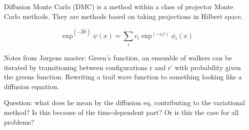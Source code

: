 Diffusion Monte Carlo (DMC) is a method within a class of projector Monte Carlo methods. They are methods based on taking projections in Hilbert space. 

\begin{equation}
\exp^{(-\hat{H}t)} \psi(x) = \sum_i c_i \exp^{(-\epsilon_i t)}\phi_i(x) 
\end{equation}

Notes from Jørgens master: Green's function, an ensemble of walkers can be iterated by transitioning between configurations r and r' with probability given the greens function. Rewriting a trail wave function to something looking like a diffusion equation.

Question: what does he mean by the diffusion eq. contributing to the variational method? Is this because of the time-dependent part? Or is this the case for all problems? 



